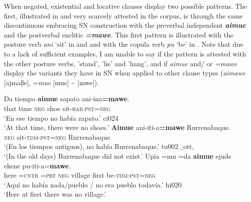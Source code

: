 \documentclass[output=paper,draft,draftmode,colorlinks,citecolor=brown]{langscibook}
\begin{document}
When negated, existential and locative clauses display two possible
patterns. The first, illustrated in  and very
scarcely attested in the corpus, is through the same discontinuous
embracing SN construction with the preverbal independent
\textbf{\textit{aimue}} and the postverbal enclitic
\textbf{\textit{=mawe}}. This first pattern is illustrated with the posture
verb \textit{ani} `sit' in  and
 and with the copula verb \textit{pu}
`be' in . Note that due to a
lack of sufficient examples, I am unable to say if the pattern is attested with the other posture verbs, 'stand', 'lie' and 'hang', and if \textit{aimue} and\slash
or \textit{=mawe} display the variants they have in SN when applied to
other clause types (\textit{aimawe} [ajma\d{ß}e], =\textit{mue} [mue]
{\textasciitilde} [mwe]).

\begin{exe}\ex\label{ex:tacana-oldtimes}\begin{xlist}
\ex\label{ex:tacana-oldtimes-noshoes}
\gll {\ob}Da tiempo{\cb} \textbf{aimue} sapato
ani-ina\textbf{=mawe}.\\
    that  time  \textsc{neg}  shoe  sit-\textsc{hab.pst=neg}\\
\glt `En ese tiempo no había zapato.' ci024\\
`At that time, there were no shoes.'
\ex\label{ex:tacana-oldtimes-Rurrenabaque}
\gll \textbf{Aimue} ani-iti-a\textbf{=mawe} Rurrenabaque.\\
    \textsc{neg}  sit-\textsc{tdm-pst=neg}  Rurrenabaque\\
\glt `(En los tiempos antiguos), no había Rurrenabaque.' tu002\_ott, \citep[8]{Ottaviano1980}\\
`(In the old days) Rurrenabaque did not exist.'
\ex\label{ex:tacana-oldtimes-village}
\gll {}Upia  =mu  =da \textbf{aimue} ejude ekene
pu-iti-a=\textbf{mawe}.\\
    here  =\textsc{cntr}  \textsc{=prt}  \textsc{neg}  village  first
    be-\textsc{tdm}-\textsc{pst=neg}\\
\glt `Aquí no había nada/pueblo \slash{}  no era pueblo todavía.' hi020\\
`Here at first there was no village.'
\end{xlist}\end{exe}
\end{document}
